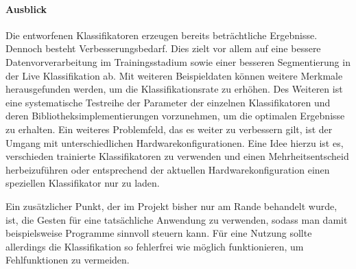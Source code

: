 \paragraph{Ausblick} 
Die entworfenen Klassifikatoren erzeugen bereits beträchtliche Ergebnisse.
Dennoch besteht Verbesserungsbedarf. Dies zielt vor allem auf eine bessere
Datenvorverarbeitung im Trainingsstadium sowie einer besseren Segmentierung in
der Live Klassifikation ab. Mit weiteren Beispieldaten können weitere Merkmale
herausgefunden werden, um die Klassifikationsrate zu erhöhen. Des Weiteren ist
eine systematische Testreihe der Parameter der einzelnen Klassifikatoren und
deren Bibliotheksimplementierungen vorzunehmen, um die optimalen Ergebnisse zu
erhalten. Ein weiteres Problemfeld, das es weiter zu verbessern gilt, ist der
Umgang mit unterschiedlichen Hardwarekonfigurationen. Eine Idee hierzu ist es,
verschieden trainierte Klassifikatoren zu verwenden und einen Mehrheitsentscheid
herbeizuführen oder entsprechend der aktuellen Hardwarekonfiguration einen
speziellen Klassifikator nur zu laden. 

Ein zusätzlicher Punkt, der im Projekt bisher nur am Rande behandelt wurde, ist,
die Gesten für eine tatsächliche Anwendung zu verwenden, sodass man damit
beispielsweise Programme sinnvoll steuern kann. Für eine Nutzung sollte
allerdings die Klassifikation so fehlerfrei wie möglich funktionieren, um
Fehlfunktionen zu vermeiden.









